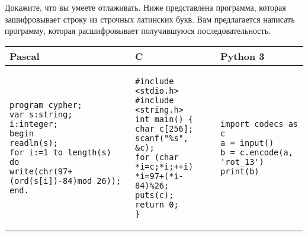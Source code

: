 Докажите, что вы умеете отлаживать. Ниже представлена программа, которая зашифровывает строку из строчных латинских букв. Вам предлагается написать программу, которая расшифровывает получившуюся последовательность.


\bigskip

\noindent\begin{tabular}{|p{}|p{}|p{}|}
\hline
\textbf{Pascal} & \textbf{C} & \textbf{Python 3} \\
\hline
\begin{lstlisting}
program cypher;
var s:string;
i:integer;
begin
readln(s);
for i:=1 to length(s) do
write(chr(97+(ord(s[i])-84)mod 26));
end.
\end{lstlisting}&

\begin{lstlisting}
#include <stdio.h>
#include <string.h>
int main() {
char c[256];
scanf("%s", &c);
for (char *i=c;*i;++i)
*i=97+(*i-84)%26;
puts(c);
return 0;
}
\end{lstlisting}&

\begin{lstlisting}
import codecs as c
a = input()
b = c.encode(a, 'rot_13')
print(b)
\end{lstlisting} \\
\hline
\end{tabular}
